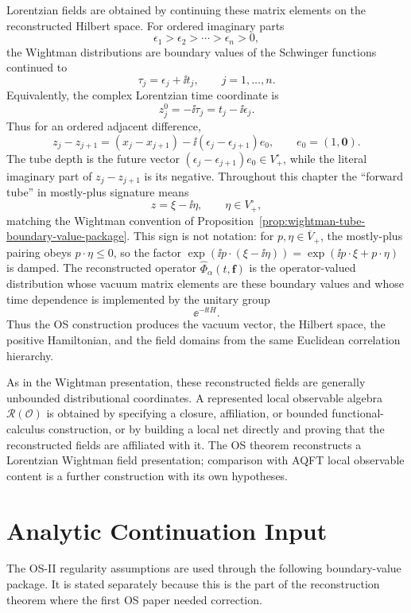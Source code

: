 Lorentzian fields are obtained by continuing these matrix elements on the
reconstructed Hilbert space.  For ordered imaginary parts
\[
  \epsilon_1>\epsilon_2>\cdots>\epsilon_n>0,
\]
the Wightman distributions are boundary values of the Schwinger functions
continued to
\begin{equation}
  \tau_j=\epsilon_j+\ii t_j,
  \qquad j=1,\ldots,n.
  \label{eq:os-wightman-boundary-values}
\end{equation}
Equivalently, the complex Lorentzian time coordinate is
\[
  z_j^0=-\ii\tau_j=t_j-\ii\epsilon_j .
\]
Thus for an ordered adjacent difference,
\[
  z_j-z_{j+1}
  =
  (x_j-x_{j+1})
  -
  \ii(\epsilon_j-\epsilon_{j+1})e_0,
  \qquad e_0=(1,\mathbf0).
\]
The tube depth is the future vector
\((\epsilon_j-\epsilon_{j+1})e_0\in V_+^\circ\), while the literal imaginary
part of \(z_j-z_{j+1}\) is its negative.  Throughout this chapter the
``forward tube'' in mostly-plus signature means
\[
  z=\xi-\ii\eta,\qquad \eta\in V_+^\circ ,
\]
matching the Wightman convention of
Proposition~\ref{prop:wightman-tube-boundary-value-package}.  This sign is
not notation: for \(p,\eta\in\overline V_+\), the mostly-plus pairing obeys
\(p\cdot\eta\le0\), so the factor
\(\exp(\ii p\cdot(\xi-\ii\eta))=\exp(\ii p\cdot\xi+p\cdot\eta)\) is damped.
The reconstructed operator \(\widehat\Phi_\alpha(t,\mathbf f)\) is the
operator-valued distribution whose vacuum matrix elements are these boundary
values and whose time dependence is implemented by the unitary group
\[
  \ee^{-\ii tH}.
\]
Thus the OS construction produces the vacuum vector, the Hilbert space, the
positive Hamiltonian, and the field domains from the same Euclidean
correlation hierarchy.

As in the Wightman presentation, these reconstructed fields are generally
unbounded distributional coordinates.  A represented local observable algebra
\(\mathcal R(\mathcal O)\) is obtained by specifying a closure, affiliation,
or bounded functional-calculus construction, or by building a local net
directly and proving that the reconstructed fields are affiliated with it.
The OS theorem reconstructs a Lorentzian Wightman field
presentation; comparison with AQFT local observable content is a further
construction with its own hypotheses.

\section{Analytic Continuation Input}

The OS-II regularity assumptions are used through the following
boundary-value package.  It is stated separately because this is the part of
the reconstruction theorem where the first OS paper needed correction.

